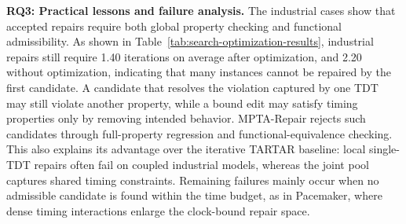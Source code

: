\noindent\textbf{RQ3: Practical lessons and failure analysis.}
The industrial cases show that accepted repairs require both global
property checking and functional admissibility. As shown in
Table~\ref{tab:search-optimization-results}, industrial repairs still
require 1.40 iterations on average after optimization, and 2.20 without
optimization, indicating that many instances cannot be repaired by the
first candidate. A candidate that resolves the violation captured by one TDT may still violate
another property, while a bound edit may satisfy timing properties only
by removing intended behavior. MPTA-Repair rejects such candidates
through full-property regression and functional-equivalence checking.
This also explains its advantage over the iterative TARTAR baseline:
local single-TDT repairs often fail on coupled industrial models,
whereas the joint pool captures shared timing constraints. Remaining
failures mainly occur when no admissible candidate is found within the
time budget, as in Pacemaker, where dense timing interactions enlarge
the clock-bound repair space.
